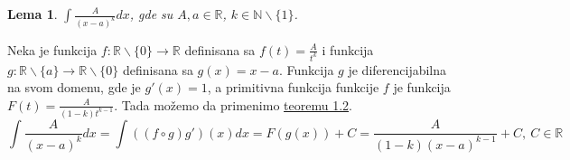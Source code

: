 \documentclass{article}
\newtheorem{lema}{Lema}[section]
\begin{document}
\begin{lemabox}
    \begin{lema}
        \label{lema_1.1.2}
        $\int \frac{A}{(x-a)^k}dx$, gde su $A,a\in \mathbb{R}$, $k\in\mathbb{N}\backslash\{1\}$.
    \end{lema}
    Neka je funkcija $f:\mathbb{R}\backslash\{0\}\longrightarrow\mathbb{R}$ definisana sa
    $f(t)=\frac{A}{t^k}$ i funkcija $g:\mathbb{R}\backslash\{a\}\longrightarrow\mathbb{R}\backslash\{0\}$
    definisana sa $g(x)=x-a$. Funkcija $g$ je diferencijabilna na svom domenu, gde je $g'(x)=1$, a primitivna funkcija
    funkcije $f$ je funkcija $F(t)=\frac{A}{(1-k)t^{k-1}}$. Tada možemo da primenimo \hyperref[teorema_1.2]{teoremu 1.2}.
    \begin{equation*}
        \int \frac{A}{(x-a)^k}dx = \int ((f\circ g) g')(x)dx = F(g(x)) + C= \frac{A}{(1-k)(x-a)^{k-1}}+ C,\ C\in\mathbb{R}
    \end{equation*}
\end{lemabox}
\end{document}
